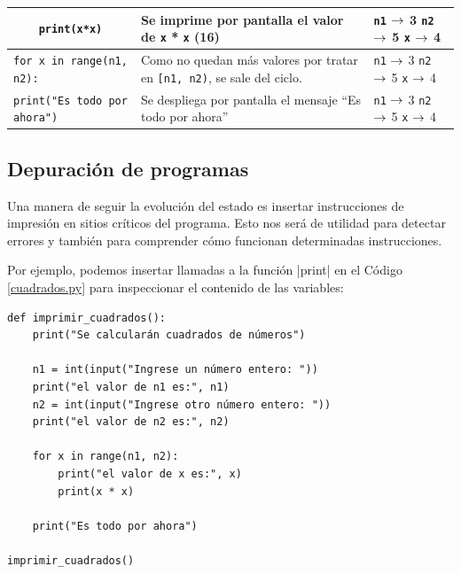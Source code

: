 \begin{longtable}[c]{|p{5.5cm}|p{5.5cm}|p{1.5cm}|}
\hline
\lstinline+    print(x*x)+
&
Se imprime por pantalla el valor de \lstinline!x! * \lstinline!x! (16)
&
\lstinline!n1! $\rightarrow$ 3 \newline
\lstinline!n2! $\rightarrow$ 5 \newline
\lstinline!x! $\rightarrow$ 4 \\

\hline
\lstinline+for x in range(n1, n2):+
&
Como no quedan más valores por tratar en \lstinline![n1, n2)!,
se sale del ciclo.
&
\lstinline!n1! $\rightarrow$ 3 \newline
\lstinline!n2! $\rightarrow$ 5 \newline
\lstinline!x! $\rightarrow$ 4 \\

\hline
\lstinline+print("Es todo por ahora")+
&
Se despliega por pantalla el mensaje ``Es todo por ahora''
&
\lstinline!n1! $\rightarrow$ 3 \newline
\lstinline!n2! $\rightarrow$ 5 \newline
\lstinline!x! $\rightarrow$ 4 \\

\hline
\end{longtable}

\subsection{Depuración de programas}

Una manera de seguir la evolución del estado es insertar instrucciones de impresión
en sitios críticos del programa. Esto nos será de utilidad para detectar errores
y también para comprender cómo funcionan determinadas instrucciones.

Por ejemplo, podemos insertar llamadas a la función |print| en el Código
\ref{cuadrados.py} para inspeccionar el contenido de las variables:

\begin{lstlisting}[numbers=none]
def imprimir_cuadrados():
    print("Se calcularán cuadrados de números")

    n1 = int(input("Ingrese un número entero: "))
    print("el valor de n1 es:", n1)
    n2 = int(input("Ingrese otro número entero: "))
    print("el valor de n2 es:", n2)

    for x in range(n1, n2):
        print("el valor de x es:", x)
        print(x * x)

    print("Es todo por ahora")

imprimir_cuadrados()
\end{lstlisting}

